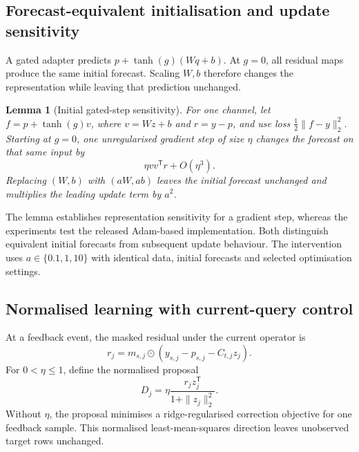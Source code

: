 \documentclass[preprint,12pt,times,nonatbib]{elsarticle}
\newtheorem{lemma}{Lemma}
\begin{document}
\subsection{Forecast-equivalent initialisation and update sensitivity}
A gated adapter predicts $p+\tanh(g)(Wq+b)$. At $g=0$, all residual maps produce the same initial forecast. Scaling $W,b$ therefore changes the representation while leaving that prediction unchanged.

\begin{lemma}[Initial gated-step sensitivity]\label{lem:gate}
For one channel, let $f=p+\tanh(g)v$, where $v=Wz+b$ and $r=y-p$, and use loss $\frac12\|f-y\|_2^2$. Starting at $g=0$, one unregularised gradient step of size $\eta$ changes the forecast on that same input by
\begin{equation}
 \eta vv^{\mathsf T}r+O(\eta^3).
\end{equation}
Replacing $(W,b)$ with $(aW,ab)$ leaves the initial forecast unchanged and multiplies the leading update term by $a^2$.
\end{lemma}

The lemma establishes representation sensitivity for a gradient step, whereas the experiments test the released Adam-based implementation. Both distinguish equivalent initial forecasts from subsequent update behaviour. The intervention uses $a\in\{0.1,1,10\}$ with identical data, initial forecasts and selected optimisation settings.

\subsection{Normalised learning with current-query control}
At a feedback event, the masked residual under the current operator is
\begin{equation}
 r_j=m_{s,j}\odot(y_{s,j}-p_{s,j}-C_{t,j}z_j).
\end{equation}
For $0<\eta\leq1$, define the normalised proposal
\begin{equation}\label{eq:direction}
 D_j=\eta\frac{r_jz_j^{\mathsf T}}{1+\|z_j\|_2^2}.
\end{equation}
Without $\eta$, the proposal minimises a ridge-regularised correction objective for one feedback sample. This normalised least-mean-squares direction leaves unobserved target rows unchanged.
\end{document}
